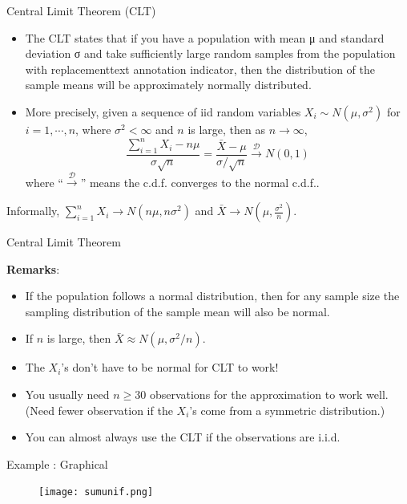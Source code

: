 \documentclass[ignorenonframetext,]{beamer}
\begin{document}
\begin{frame}{Central Limit Theorem (CLT)}

\begin{itemize}
\item
  The CLT states that if you have a population with mean μ and standard
  deviation σ and take sufficiently large random samples from the
  population with replacementtext annotation indicator, then the
  distribution of the sample means will be approximately normally
  distributed.
\item
  More precisely, given a sequence of iid random variables
  \(X_i\sim N(\mu,\sigma^2)\) for \(i=1,\cdots,n\), where
  \(\sigma^2<\infty\) and \(n\) is large, then as \(n\to\infty\),
  \[\frac{\sum^n_{i=1}X_i-n\mu}{\sigma\sqrt{n}}=\frac{\bar{X}-\mu}{\sigma/\sqrt{n}}\stackrel{\mathcal{D}}{\to}N(0,1)\]
  where ``\(\stackrel{\mathcal{D}}{\to}\)'' means the c.d.f. converges
  to the normal c.d.f..
\end{itemize}

Informally, \(\sum^n_{i=1}X_i\to N(n\mu,n\sigma^2)\) and
\(\bar{X}\to N(\mu,\frac{\sigma^2}{n})\).

\end{frame}

\begin{frame}{Central Limit Theorem}

\textbf{Remarks}:

\begin{itemize}
\item
  If the population follows a normal distribution, then for any sample
  size the sampling distribution of the sample mean will also be normal.
\item
  If \(n\) is large, then \(\bar{X}\approx N(\mu,\sigma^2/n)\).
\item
  The \(X_i\)'s don't have to be normal for CLT to work!
\item
  You usually need \(n\ge 30\) observations for the approximation to
  work well. (Need fewer observation if the \(X_i\)'s come from a
  symmetric distribution.)
\item
  You can almost always use the CLT if the observations are i.i.d.
\end{itemize}

\end{frame}

\begin{frame}{Example : Graphical}

\begin{figure}
\centering
\texttt{[image: sumunif.png]}
\caption{}
\end{figure}

\end{frame}
\end{document}
